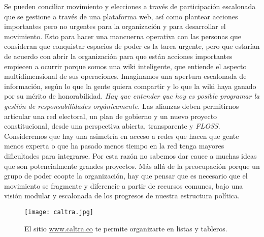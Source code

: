 Se pueden conciliar movimiento y elecciones a través de participación escalonada que se gestione a través de una plataforma web, así como plantear acciones importantes pero no urgentes para la organización y para desarrollar el movimiento. Esto para hacer una mancuerna operativa con las personas que consideran que conquistar espacios de poder es la tarea urgente, pero que estarían de acuerdo con abrir la organización para que están acciones importantes empiecen a ocurrir porque somos una wiki inteligente, que entiende el aspecto multidimensional de sus operaciones. Imaginamos una apertura escalonada de información, según lo que la gente quiera compartir y lo que la wiki haya ganado por su mérito de honorabilidad. \emph{Hay que entender que hoy es posible programar la gestión de responsabilidades orgánicamente.} Las alianzas deben permitirnos articular una red electoral, un plan de gobierno y un nuevo proyecto constitucional, desde una perspectiva abierta, transparente y \emph{FLOSS}. Consideremos que hay una asimetría en acceso a redes que hacen que gente menos experta o que ha pasado menos tiempo en la red tenga mayores dificultades para integrarse. Por esta razón no sabemos dar cauce a muchas ideas que son potencialmente grandes proyectos. Más allá de la preocupación porque un grupo de poder coopte la organización, hay que pensar que es necesario que el movimiento se fragmente y diferencie a partir de recursos comunes, bajo una visión modular y escalonada de los progresos de nuestra estructura política.

\begin{figure}[htbp]
	\centering
	\texttt{[image: caltra.jpg]}
	\caption{El sitio \url{www.caltra.co} te permite organizarte en listas y tableros.}
\end{figure}

